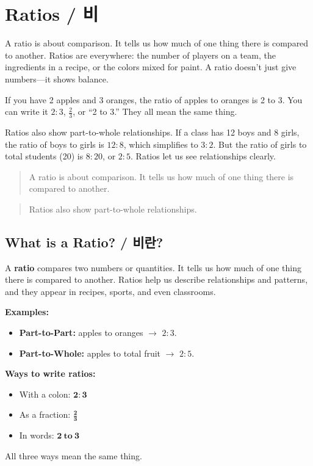 \section{Ratios / 비}

A ratio is about comparison. It tells us how much of one thing there is compared to
another. Ratios are everywhere: the number of players on a team, the ingredients in
a recipe, or the colors mixed for paint. A ratio doesn't just give numbers—it shows
balance.

If you have 2 apples and 3 oranges, the ratio of apples to oranges is 2 to 3. You
can write it \(2:3\), \(\frac{2}{3}\), or ``2 to 3.'' They all mean the same
thing.

Ratios also show part-to-whole relationships. If a class has 12 boys and 8 girls,
the ratio of boys to girls is \(12:8\), which simplifies to \(3:2\). But the ratio
of girls to total students (20) is \(8:20\), or \(2:5\). Ratios let us see
relationships clearly.

\blockquote{A ratio is about comparison. It tells us how much of one thing there is compared to another.}


\blockquote{Ratios also show part-to-whole relationships.}


\subsection{What is a Ratio? / 비란?}

A \textbf{ratio} compares two numbers or quantities. It tells us how much of one
thing there is compared to another. Ratios help us describe relationships and
patterns, and they appear in recipes, sports, and even classrooms.

\textbf{Examples:}
\begin{itemize}
  \item \textbf{Part-to-Part:} apples to oranges \(\rightarrow\) \(2:3\).
  \item \textbf{Part-to-Whole:} apples to total fruit \(\rightarrow\) \(2:5\).
\end{itemize}

\textbf{Ways to write ratios:}
\begin{itemize}
  \item With a colon: \(\mathbf{2:3}\)
  \item As a fraction: \(\mathbf{\frac{2}{3}}\)
  \item In words: \(\mathbf{2\ \text{to}\ 3}\)
\end{itemize}
All three ways mean the same thing.

